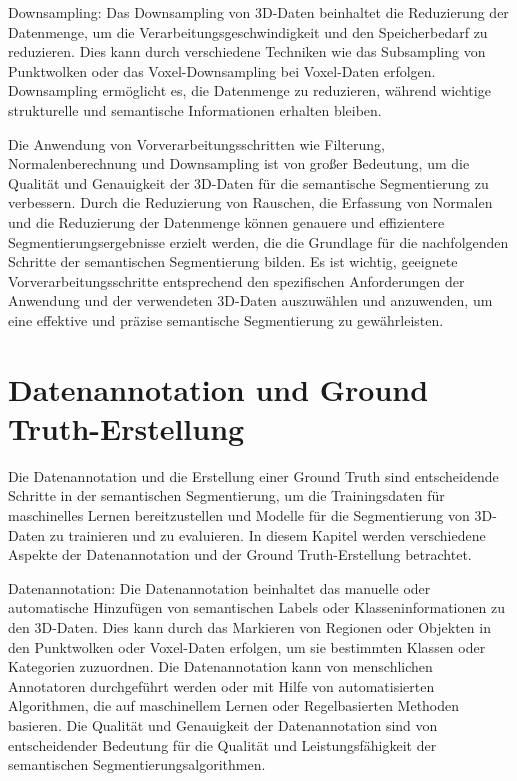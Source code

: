 Downsampling: Das Downsampling von 3D-Daten beinhaltet die Reduzierung der
Datenmenge, um die Verarbeitungsgeschwindigkeit und den Speicherbedarf zu
reduzieren. Dies kann durch verschiedene Techniken wie das Subsampling von
Punktwolken oder das Voxel-Downsampling bei Voxel-Daten erfolgen. Downsampling
ermöglicht es, die Datenmenge zu reduzieren, während wichtige strukturelle und
semantische Informationen erhalten bleiben.

Die Anwendung von Vorverarbeitungsschritten wie Filterung, Normalenberechnung
und Downsampling ist von großer Bedeutung, um die Qualität und Genauigkeit der
3D-Daten für die semantische Segmentierung zu verbessern. Durch die Reduzierung
von Rauschen, die Erfassung von Normalen und die Reduzierung der Datenmenge
können genauere und effizientere Segmentierungsergebnisse erzielt werden, die
die Grundlage für die nachfolgenden Schritte der semantischen Segmentierung
bilden. Es ist wichtig, geeignete Vorverarbeitungsschritte entsprechend den
spezifischen Anforderungen der Anwendung und der verwendeten 3D-Daten
auszuwählen und anzuwenden, um eine effektive und präzise semantische
Segmentierung zu gewährleisten.

\section{Datenannotation und Ground Truth-Erstellung}

Die Datenannotation und die Erstellung einer Ground Truth sind entscheidende
Schritte in der semantischen Segmentierung, um die Trainingsdaten für
maschinelles Lernen bereitzustellen und Modelle für die Segmentierung von
3D-Daten zu trainieren und zu evaluieren. In diesem Kapitel werden verschiedene
Aspekte der Datenannotation und der Ground Truth-Erstellung betrachtet.

Datenannotation: Die Datenannotation beinhaltet das manuelle oder automatische
Hinzufügen von semantischen Labels oder Klasseninformationen zu den 3D-Daten.
Dies kann durch das Markieren von Regionen oder Objekten in den Punktwolken
oder Voxel-Daten erfolgen, um sie bestimmten Klassen oder Kategorien
zuzuordnen. Die Datenannotation kann von menschlichen Annotatoren durchgeführt
werden oder mit Hilfe von automatisierten Algorithmen, die auf maschinellem
Lernen oder Regelbasierten Methoden basieren. Die Qualität und Genauigkeit der
Datenannotation sind von entscheidender Bedeutung für die Qualität und
Leistungsfähigkeit der semantischen Segmentierungsalgorithmen.

